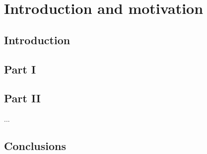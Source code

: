 \chapter{Introduction and motivation}

\section{Introduction}


\section{Part I}\label{Part I}  %


\section{Part II}\label{Part II} %

...

\section{Conclusions}\label{conclusions}
 